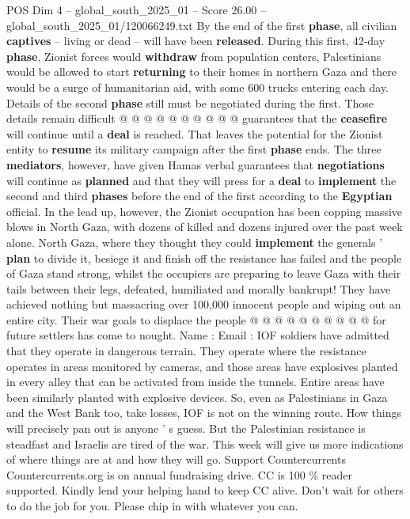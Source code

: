 \begin{textsample}{POS Dim 4 – global\_south\_2025\_01 – Score 26.00 – global\_south\_2025\_01/120066249.txt}
By the end of the first \textbf{phase}, all civilian \textbf{captives} -- living or dead -- will have been \textbf{released}.
During this first, 42-day \textbf{phase}, Zionist forces would \textbf{withdraw} from population centers, Palestinians would be allowed to start \textbf{returning} to their homes in northern Gaza and there would be a surge of humanitarian aid, with some 600 trucks entering each day.
Details of the second \textbf{phase} still must be negotiated during the first.
Those details remain difficult @ @ @ @ @ @ @ @ @ @ guarantees that the \textbf{ceasefire} will continue until a \textbf{deal} is reached.
That leaves the potential for the Zionist entity to \textbf{resume} its military campaign after the first \textbf{phase} ends.
The three \textbf{mediators}, however, have given Hamas verbal guarantees that \textbf{negotiations} will continue as \textbf{planned} and that they will press for a \textbf{deal} to \textbf{implement} the second and third \textbf{phases} before the end of the first according to the \textbf{Egyptian} official.
In the lead up, however, the Zionist occupation has been copping massive blows in North Gaza, with dozens of killed and dozens injured over the past week alone.
North Gaza, where they thought they could \textbf{implement} the generals ' \textbf{plan} to divide it, besiege it and finish off the resistance has failed and the people of Gaza stand strong, whilst the occupiers are preparing to leave Gaza with their tails between their legs, defeated, humiliated and morally bankrupt!
They have achieved nothing but massacring over 100,000 innocent people and wiping out an entire city.
Their war goals to displace the people @ @ @ @ @ @ @ @ @ @ for future settlers has come to nought.
Name : Email : IOF soldiers have admitted that they operate in dangerous terrain.
They operate where the resistance operates in areas monitored by cameras, and those areas have explosives planted in every alley that can be activated from inside the tunnels.
Entire areas have been similarly planted with explosive devices.
So, even as Palestinians in Gaza and the West Bank too, take losses, IOF is not on the winning route.
How things will precisely pan out is anyone ' s guess.
But the Palestinian resistance is steadfast and Israelis are tired of the war.
This week will give us more indications of where things are at and how they will go.
Support Countercurrents Countercurrents.org is on annual fundraising drive.
CC is 100 \% reader supported.
Kindly lend your helping hand to keep CC alive.
Don't wait for others to do the job for you.
Please chip in with whatever you can.

\end{textsample}
